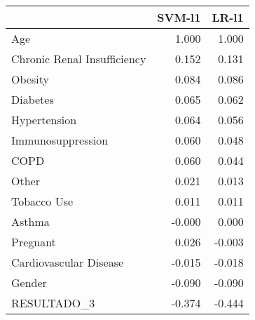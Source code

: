 \begin{tabular}{lrr}
\toprule
{} &  SVM-l1 &  LR-l1 \\
\midrule
Age                         &   1.000 &  1.000 \\
Chronic Renal Insufficiency &   0.152 &  0.131 \\
Obesity                     &   0.084 &  0.086 \\
Diabetes                    &   0.065 &  0.062 \\
Hypertension                &   0.064 &  0.056 \\
Immunosuppression           &   0.060 &  0.048 \\
COPD                        &   0.060 &  0.044 \\
Other                       &   0.021 &  0.013 \\
Tobacco Use                 &   0.011 &  0.011 \\
Asthma                      &  -0.000 &  0.000 \\
Pregnant                    &   0.026 & -0.003 \\
Cardiovascular Disease      &  -0.015 & -0.018 \\
Gender                      &  -0.090 & -0.090 \\
RESULTADO\_3                 &  -0.374 & -0.444 \\
\bottomrule
\end{tabular}
